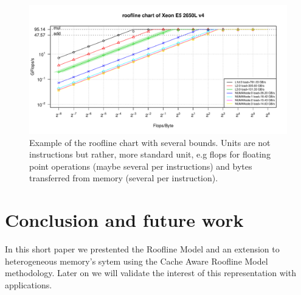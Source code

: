 \documentclass[twoside,twocolumn,8pt]{extarticle}
\begin{document}
\begin{figure}
  \centering
  \includegraphics[width=\textwidth]{pictures/roofline_model}
  \caption{Example of the roofline chart with several bounds. Units are not instructions but rather, more standard unit, e.g flops
    for floating point operations (maybe several per instructions) and bytes transferred from memory (several per instruction).}
  \label{fig:orig_model}
\end{figure}

\section{Conclusion and future work}\label{sec:conclusion}
In this short paper we prestented the Roofline Model and an extension to heterogeneous memory's sytem using the Cache Aware
Roofline Model methodology. Later on we will validate the interest of this representation with applications. 



\end{document}
